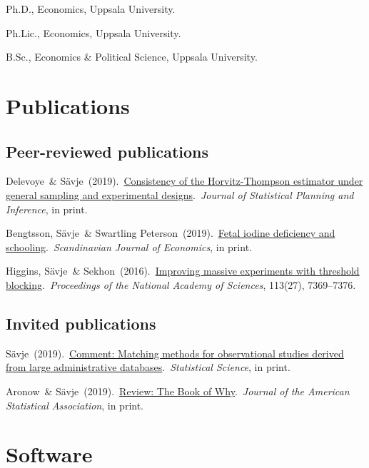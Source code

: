 \documentclass[10pt,letterpaper]{article}
\newenvironment{singledatelist}{
	\begin{list}{}{
		\setlength{\parskip}{0pt}
		\setlength{\itemsep}{4pt}
		\setlength{\parsep}{0.3em}
		\setlength{\leftmargin}{3.5em}
		\setlength{\labelwidth}{3.5em}
		\setlength{\labelsep}{1.5em}
		}
	}{
\end{list}
}
\newcommand{\dateitem}[2][]{\item[{#1}] {#2}}
\newenvironment{infolist}{
	\begin{list}{}{
		\setlength{\parskip}{0pt}
		\setlength{\itemsep}{4pt}
		\setlength{\parsep}{0.3em}
		\setlength{\leftmargin}{0em}
		\setlength{\labelwidth}{0em}
		}
	}{
\end{list}
}
\newcommand{\infoitem}[1]{\item {#1}}
\begin{document}
	\begin{singledatelist}
		\dateitem[2015]{Ph.D., Economics, Uppsala University.}
		\dateitem[2013]{Ph.Lic., Economics, Uppsala University.}
		\dateitem[2010]{B.Sc., Economics \& Political Science, Uppsala University.}
	\end{singledatelist}


	\section*{Publications}

	\subsection*{Peer-reviewed publications}

	\begin{infolist}
		\infoitem{Delevoye\ \& Sävje\ (2019).\ \href{https://fredriksavje.com/papers/ht-consistency.pdf}{Consistency of the Horvitz-Thompson estimator under general sampling and experimental designs}.\ \textit{Journal of Statistical Planning and Inference}, in print.}
		\infoitem{Bengtsson, Sävje\ \& Swartling Peterson\ (2019).\ \href{https://onlinelibrary.wiley.com/doi/abs/10.1111/sjoe.12341}{Fetal iodine deficiency and schooling}.\ \textit{Scandinavian Journal of Economics}, in print.}
		\infoitem{Higgins, Sävje\ \& Sekhon\ (2016).\ \href{https://www.pnas.org/content/113/27/7369}{Improving massive experiments with threshold blocking}.\ \textit{Proceedings of the National Academy of Sciences}, 113(27), 7369--7376.}
	\end{infolist}


	\subsection*{Invited publications}

	\begin{infolist}
		\infoitem{Sävje\ (2019).\ \href{https://www.e-publications.org/ims/submission/STS/user/submissionFile/41236?confirm=452fc878}{Comment: Matching methods for observational studies derived from large administrative databases}.\ \textit{Statistical Science}, in print.}
		\infoitem{Aronow\ \& Sävje\ (2019).\ \href{https://fredriksavje.com/papers/TBOW-review.pdf}{Review: The Book of Why}.\ \textit{Journal of the American Statistical Association}, in print.}
	\end{infolist}


	\section*{Software}
\end{document}
